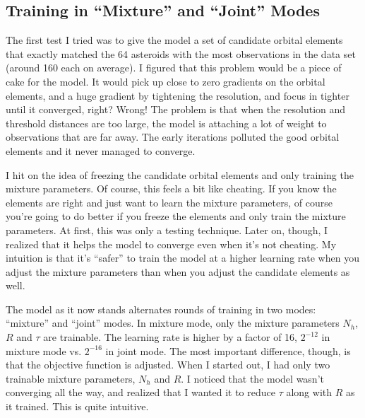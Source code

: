 \subsection{Training in ``Mixture'' and ``Joint'' Modes}
The first test I tried was to give the model a set of candidate orbital elements that exactly 
matched the 64 asteroids with the most observations in the data set (around 160 each on average).
I figured that this problem would be a piece of cake for the model.
It would pick up close to zero gradients on the orbital elements, and a huge gradient by tightening the resolution,
and focus in tighter until it converged, right?
Wrong! The problem is that when the resolution and threshold distances are too large, 
the model is attaching a lot of weight to observations that are far away.
The early iterations polluted the good orbital elements and it never managed to converge.

I hit on the idea of freezing the candidate orbital elements and only training the mixture parameters.
Of course, this feels a bit like cheating.  
If you know the elements are right and just want to learn the mixture parameters, 
of course you're going to do better if you freeze the elements and only train the mixture parameters.
At first, this was only a testing technique.
Later on, though, I realized that it helps the model to converge even when it's not cheating.
My intuition is that it's ``safer'' to train the model at a higher learning rate when you adjust 
the mixture parameters than when you adjust the candidate elements as well.

The model as it now stands alternates rounds of training in two modes: ``mixture'' and ``joint'' modes.
In mixture mode, only the mixture parameters $N_h$, $R$ and $\tau$ are trainable.
The learning rate is higher by a factor of 16, $2^{-12}$ in mixture mode vs. $2^{-16}$ in joint mode.
The most important difference, though, is that the objective function is adjusted.
When I started out, I had only two trainable mixture parameters, $N_h$ and $R$.
I noticed that the model wasn't converging all the way, and realized that I wanted it to reduce $\tau$ along with $R$ as it trained.
This is quite intuitive.  

